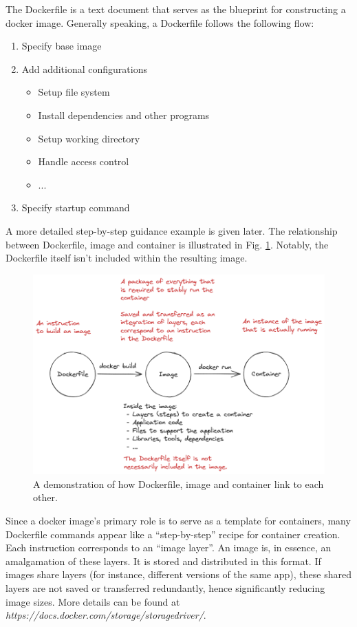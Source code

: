 The Dockerfile is a text document that serves as the blueprint for constructing a docker image. Generally speaking, a Dockerfile follows the following flow:
\begin{enumerate}[(1)]
	\item Specify base image
	\item Add additional configurations
	\begin{itemize}
		\item Setup file system
		\item Install dependencies and other programs
		\item Setup working directory
		\item Handle access control
		\item ...
	\end{itemize}
	\item Specify startup command
\end{enumerate}
A more detailed step-by-step guidance example is given later. The relationship between Dockerfile, image and container is illustrated in Fig. \ref{ch:vac:fig:dockerfiletoimage}. Notably, the Dockerfile itself isn't included within the resulting image.

\begin{figure}[htbp]
	\centering
	\includegraphics[width=350pt]{chapters/part-3/figures/dockerfiletoimage.png}
	\caption{A demonstration of how Dockerfile, image and container link to each other.} \label{ch:vac:fig:dockerfiletoimage}
\end{figure}

Since a docker image's primary role is to serve as a template for containers, many Dockerfile commands appear like a ``step-by-step'' recipe for container creation. Each instruction corresponds to an ``image layer''. An image is, in essence, an amalgamation of these layers. It is stored and distributed in this format. If images share layers (for instance, different versions of the same app), these shared layers are not saved or transferred redundantly, hence significantly reducing image sizes. More details can be found at \textit{https://docs.docker.com/storage/storagedriver/}.


